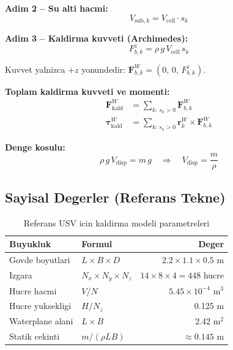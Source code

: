 \documentclass[12pt,a4paper]{article}
\newcommand{\Fvec}{\mathbf{F}}
\begin{document}
\textbf{Adim 2 -- Su alti hacmi:}
\begin{equation}
  V_{\text{sub},k} = V_{\text{cell}} \cdot s_k
  \label{eq:sub_vol}
\end{equation}

\textbf{Adim 3 -- Kaldirma kuvveti (Archimedes):}
\begin{equation}
  \boxed{F_{b,k}^z = \rho\, g\, V_{\text{cell}}\, s_k}
  \label{eq:buoyancy}
\end{equation}

Kuvvet yalnizca $+z$ yonundedir: $\mathbf{F}_{b,k}^W = (0,\,0,\,F_{b,k}^z)$.

\textbf{Toplam kaldirma kuvveti ve momenti:}
\begin{align}
  \Fvec_{\text{kald}}^W &= \sum_{k:\,s_k>0} \mathbf{F}_{b,k}^W
  \label{eq:total_buoy} \\[4pt]
  \boldsymbol{\tau}_{\text{kald}}^W &= \sum_{k:\,s_k>0} \mathbf{r}_k^W \times \mathbf{F}_{b,k}^W
  \label{eq:total_buoy_moment}
\end{align}

\textbf{Denge kosulu:}
\begin{equation}
  \rho\,g\,V_{\text{disp}} = m\,g
  \quad\Rightarrow\quad
  V_{\text{disp}} = \frac{m}{\rho}
  \label{eq:equilibrium}
\end{equation}

\subsection{Sayisal Degerler (Referans Tekne)}

\begin{table}[H]
  \centering
  \caption{Referans USV icin kaldirma modeli parametreleri}
  \begin{tabular}{llr}
    \toprule
    \textbf{Buyukluk} & \textbf{Formul} & \textbf{Deger} \\
    \midrule
    Govde boyutlari & $L \times B \times D$ & $2.2\times 1.1\times 0.5$ m \\
    Izgara & $N_x\times N_y\times N_z$ & $14\times 8\times 4 = 448$ hucre \\
    Hucre hacmi & $V/N$ & $5.45\times10^{-4}$ m$^3$ \\
    Hucre yuksekligi & $H/N_z$ & 0.125 m \\
    Waterplane alani & $L\times B$ & 2.42 m$^2$ \\
    Statik cekinti & $m/(\rho L B)$ & $\approx 0.145$ m \\
    \bottomrule
  \end{tabular}
\end{table}
\end{document}
